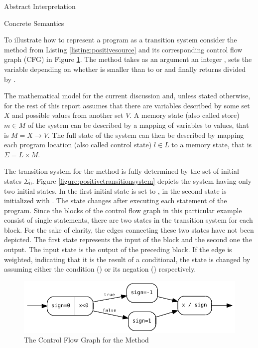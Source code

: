 \begin{chapter}{Abstract Interpretation}
\begin{section}{Concrete Semantics}
		\begin{example}
			\label{example:transitionsystem}
			To illustrate how to represent a program as a transition system consider the method  from Listing \ref{listing:positivesource} and its corresponding control flow graph (CFG) in Figure \ref{figure:positivecfg}. The method takes as an argument an integer \cx, sets the \csign variable depending on whether \cx is smaller than  to  or  and finally returns \cx divided by \csign. 

			The mathematical model for the current discussion and, unless stated otherwise, for the rest of this report assumes that there are variables described by some set $X$ and possible values from another set $V$. A memory state (also called store) $m \in M$ of the system can be described by a mapping of variables to values, that is $M = X \to V$. The full state of the system can then be described by mapping each program location (also called control state) $l \in L$ to a memory state, that is $\Sigma = L \times M$.

			The transition system for the  method is fully determined by the set of initial states $\Sigma_0$. Figure \ref{figure:positivetransitionsystem} depicts the system having only two initial states. In the first initial state \cx is set to , in the second state \cx is initialized with . The state changes after executing each statement of the program. Since the blocks of the control flow graph in this particular example consist of single statements, there are two states in the transition system for each block. For the sake of clarity, the edges connecting these two states have not been depicted. The first state represents the input of the block and the second one the output. The input state is the output of the preceding block. If the edge is weighted, indicating that it is the result of a conditional, the state is changed by assuming either the condition () or its negation () respectively.
			\exampleend

			

			\begin{figure}
				\centering
				\includegraphics{Graphs/Examples_ifExampleCFG.pdf}
				\caption{The Control Flow Graph for the  Method}
				\label{figure:positivecfg}
			\end{figure}


\end{example}
\end{section}
\end{chapter}
